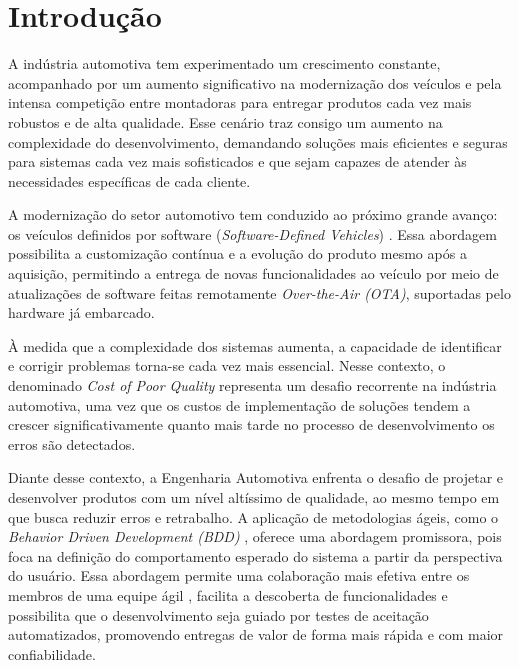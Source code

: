 \chapter{Introdução}

A indústria automotiva tem experimentado um crescimento constante, acompanhado por um aumento significativo na modernização dos veículos e pela intensa competição entre 
montadoras para entregar produtos cada vez mais robustos e de alta qualidade. Esse cenário traz consigo um aumento na complexidade do desenvolvimento, demandando soluções 
mais eficientes e seguras para sistemas cada vez mais sofisticados e que sejam capazes de atender às necessidades específicas de cada cliente.

A modernização do setor automotivo tem conduzido ao próximo grande avanço: os veículos definidos por software (\textit{Software-Defined Vehicles}) 
\cite{softwareVehicles2025}. Essa abordagem possibilita a customização contínua e a evolução do produto mesmo após a aquisição, permitindo a entrega de novas 
funcionalidades ao veículo por meio de atualizações de software feitas remotamente \textit{Over-the-Air (OTA)}, suportadas pelo hardware já embarcado.

À medida que a complexidade dos sistemas aumenta, a capacidade de identificar e corrigir problemas torna-se cada vez mais essencial. Nesse contexto, o denominado 
\textit{Cost of Poor Quality} \cite{costOfPoorQuality} representa um desafio recorrente na indústria automotiva, uma vez que os custos de implementação de soluções 
tendem a crescer significativamente quanto mais tarde no processo de desenvolvimento os erros são detectados. 

Diante desse contexto, a Engenharia Automotiva enfrenta o desafio de projetar e desenvolver produtos com um nível altíssimo de qualidade, ao mesmo tempo em que busca reduzir 
erros e retrabalho. A aplicação de metodologias ágeis, como o \textit{Behavior Driven Development (BDD)} \cite{north2006bdd}, oferece uma abordagem promissora, pois foca na 
definição do comportamento esperado do sistema a partir da perspectiva do usuário. Essa abordagem permite uma colaboração mais efetiva entre os membros de uma equipe ágil 
\cite{atlassianAgileTeams}, facilita a descoberta de funcionalidades e possibilita que o desenvolvimento seja guiado por testes de aceitação automatizados, promovendo 
entregas de valor de forma mais rápida e com maior confiabilidade.

